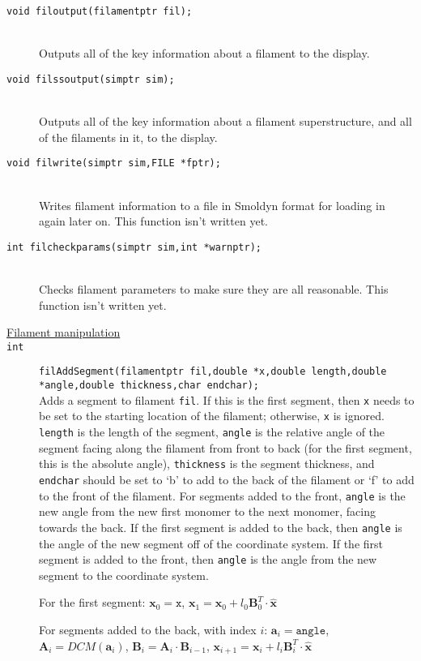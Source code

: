 \documentclass {book}
\newcommand {\ttt} {\texttt}
\begin{document}
\begin{description}
\item[\ttt{void filoutput(filamentptr fil);}]
\hfill \\
Outputs all of the key information about a filament to the display.

\item[\ttt{void filssoutput(simptr sim);}]
\hfill \\
Outputs all of the key information about a filament superstructure, and all of the filaments in it, to the display.

\item[\ttt{void filwrite(simptr sim,FILE *fptr);}]
\hfill \\
Writes filament information to a file in Smoldyn format for loading in again later on. This function isn't written yet.

\item[\ttt{int filcheckparams(simptr sim,int *warnptr);}]
\hfill \\
Checks filament parameters to make sure they are all reasonable. This function isn't written yet.

\item[\underline{Filament manipulation}]

\item[\ttt{int}]
\ttt{filAddSegment(filamentptr fil,double *x,double length,double *angle,double thickness,char endchar);}
\hfill \\
Adds a segment to filament \ttt{fil}. If this is the first segment, then \ttt{x} needs to be set to the starting location of the filament; otherwise, \ttt{x} is ignored. \ttt{length} is the length of the segment, \ttt{angle} is the relative angle of the segment facing along the filament from front to back (for the first segment, this is the absolute angle), \ttt{thickness} is the segment thickness, and \ttt{endchar} should be set to `b' to add to the back of the filament or `f' to add to the front of the filament. For segments added to the front, \ttt{angle} is the new angle from the new first monomer to the next monomer, facing towards the back. If the first segment is added to the back, then \ttt{angle} is the angle of the new segment off of the coordinate system. If the first segment is added to the front, then \ttt{angle} is the angle from the new segment to the coordinate system.

For the first segment:
$\mathbf{x}_0=\ttt{x}$,
$\mathbf{x}_1=\mathbf{x}_0 + l_0 \mathbf{B}^T_0 \cdot \mathbf{\hat{x}}$

For segments added to the back, with index $i$:
$\mathbf{a}_i = \ttt{angle}$,
$\mathbf{A}_i = DCM(\mathbf{a}_i)$,
$\mathbf{B}_i = \mathbf{A}_i \cdot \mathbf{B}_{i-1}$,
$\mathbf{x}_{i+1} = \mathbf{x}_i + l_i \mathbf{B}^T_i \cdot \mathbf{\hat{x}}$


\end{description}
\end{document}
